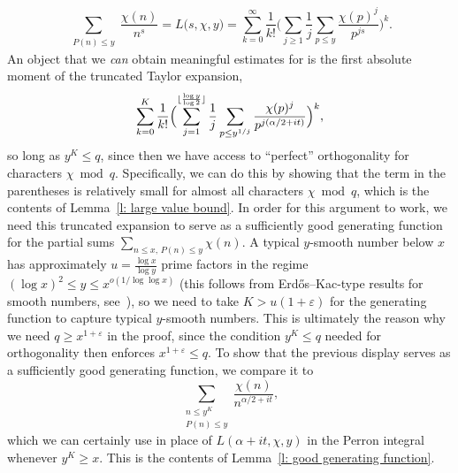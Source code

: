 \documentclass[a4paper,12pt,reqno]{amsart}
\begin{document}
\begin{equation}\label{equ: full expansion}
\sum_{\substack{P(n) \leq y}} \frac{\chi(n)}{n^s} = L \bigl( s, \chi, y \bigr) = \sum_{k=0}^{\infty} \frac{1}{k!} \biggl( \sum_{j \geq 1} \frac{1}{j} \sum_{p \leq y} \frac{\chi(p)^j}{p^{j s}} \biggr)^{k} .
\end{equation}
An object that we \emph{can} obtain meaningful estimates for is the first absolute moment of the truncated Taylor expansion,
\[
\sum_{k=0}^{K} \frac{1}{k!} \Bigl( \sum_{j=1}^{\lfloor \frac{\log y}{\log 2} \rfloor} \frac{1}{j} \sum_{p \leq y^{1/j}} \frac{\chi(p)^j}{p^{j(\alpha/2 + it)}} \Bigr)^k ,
\]
so long as $y^K \leq q$, since then we have access to ``perfect'' orthogonality for characters $\chi \bmod q$. Specifically, we can do this by showing that the term in the parentheses is relatively small for almost all characters $\chi \bmod q$, which is the contents of Lemma~\ref{l: large value bound}. In order for this argument to work, we need this truncated expansion to serve as a sufficiently good generating function for the partial sums $\sum_{n \leq x, \, P(n) \leq y} \chi (n)$. A typical $y$-smooth number below $x$ has approximately $u = \frac{\log x}{\log y}$ prime factors in the regime $(\log x)^2 \leq y \leq x^{o(1/\log \log x)}$ (this follows from Erdős--Kac-type results for smooth numbers, see~\citet{Alladi}), so we need to take $K > u(1+\varepsilon)$ for the generating function to capture typical $y$-smooth numbers. This is ultimately the reason why we need $q \geq x^{1 + \varepsilon}$ in the proof, since the condition $y^K \leq q$ needed for orthogonality then enforces $x^{1 + \varepsilon} \leq q$. To show that the previous display serves as a sufficiently good generating function, we compare it to
\[
\sum_{\substack{n \leq y^K \\ P(n) \leq y}} \frac{\chi(n)}{n^{\alpha/2+it}},
\]
which we can certainly use in place of $L ( \alpha + it, \chi, y )$ in the Perron integral whenever $y^K \geq x$. This is the contents of Lemma~\ref{l: good generating function}.
\end{document}
